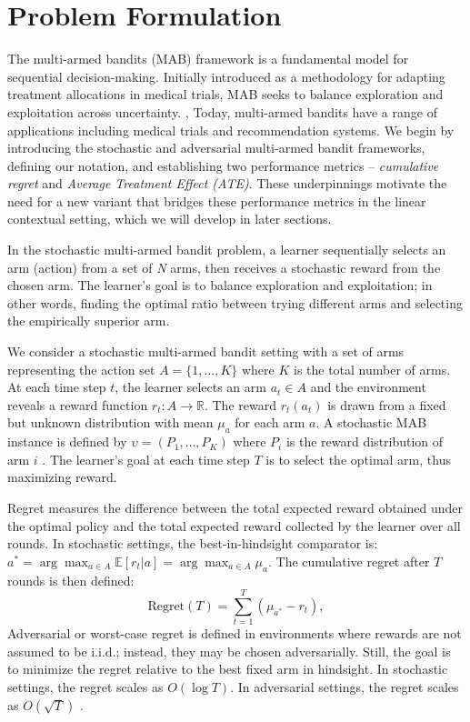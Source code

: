 \section{Problem Formulation}\label{sec:problem}

The multi-armed bandits (MAB) framework is a fundamental model for sequential decision-making. Initially introduced as a methodology for adapting treatment allocations in medical trials, MAB seeks to balance exploration and exploitation across uncertainty. \citep{agrawal2013thompson}, \citep{lattimore2020bandit} Today, multi-armed bandits have a range of applications including medical trials and recommendation systems. We begin by introducing the stochastic and adversarial multi-armed bandit frameworks, defining our notation, and establishing two performance metrics -- \textit{cumulative regret} and \textit{Average Treatment Effect (ATE)}. These underpinnings motivate the need for a new variant that bridges these performance metrics in the linear contextual setting, which we will develop in later sections. 

In the stochastic multi-armed bandit problem, a learner sequentially selects an arm (action) from a set of \textit{N} arms, then receives a stochastic reward from the chosen arm. The learner's goal is to balance exploration and exploitation; in other words, finding the optimal ratio between trying different arms and selecting the empirically superior arm.

We consider a stochastic multi-armed bandit setting with a set of arms representing the action set \(\mathit{A} = \{1, \dots, \mathit{K}\}\) where \(\mathit{K}\) is the total number of arms. At each time step \(t\), the learner selects an arm \(a_t\in A\) and the environment reveals a reward function \(r_t: A \to \mathbb{R}\). The reward \(r_t(a_t)\) is drawn from a fixed but unknown distribution with mean \(\mu_a\) for each arm \(a\). A stochastic MAB instance is defined by \( \upsilon = (P_1, \dots, P_K) \) where \(P_i\) is the reward distribution of arm \(i\) \citep{simchilevi2023adaptive}. The learner's goal at each time step \(T\) is to select the optimal arm, thus maximizing reward.

Regret measures the difference between the total expected reward obtained under the optimal policy and the total expected reward collected by the learner over all rounds. In stochastic settings, the best-in-hindsight comparator is: \(a^* = \arg\max_{a \in A} \mathbb{E}[r_t | a] = \arg\max_{a \in A} \mu_a. \) The cumulative regret after \(T\) rounds is then defined:
\begin{equation}
\label{eq:regret}
\text{Regret}(T) = \sum_{t=1}^T \left(\mu_{a^*} - r_t\right),
\end{equation}
Adversarial or worst-case regret is defined in environments where rewards are not assumed to be i.i.d.; instead, they may be chosen adversarially. Still, the goal is to minimize the regret relative to the best fixed arm in hindsight. In stochastic settings, the regret scales as \(O(\log T)\). In adversarial settings, the regret scales as \(O(\sqrt{T})\) \citep{auer2002exp3}.

